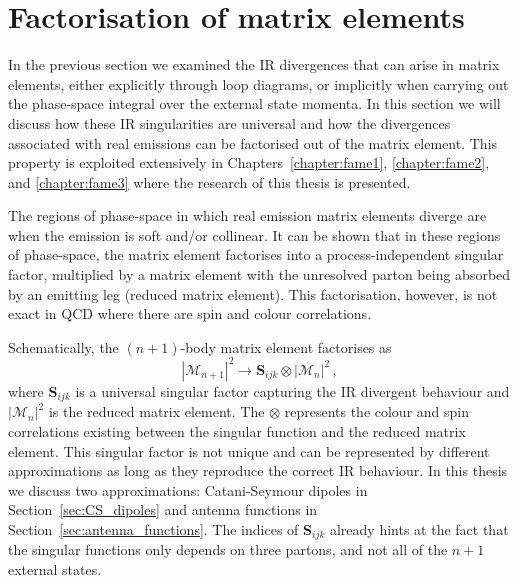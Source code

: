\documentclass[main.tex]{subfiles}
\begin{document}
\section{Factorisation of matrix elements}\label{sec:me_factorisation}
    In the previous section we examined the IR divergences
    that can arise in matrix elements, either explicitly
    through loop diagrams, or implicitly when carrying
    out the phase-space integral over the external state
    momenta. In this section we will discuss how these IR
    singularities are universal and how the divergences
    associated with real emissions can be factorised out
    of the matrix element. This property is exploited
    extensively in Chapters~\ref{chapter:fame1}, \ref{chapter:fame2},
    and \ref{chapter:fame3}
    where the research of this thesis is presented.

    The regions of phase-space in which real emission
    matrix elements diverge are when the emission is
    soft and/or collinear. It can be shown that in these
    regions of phase-space, the matrix element factorises
    into a process-independent singular factor, multiplied
    by a matrix element with the unresolved parton
    being absorbed by an emitting leg (reduced matrix
    element). This factorisation, however, is not exact
    in QCD where there are spin and colour correlations.

    Schematically, the $(n+1)$-body matrix element
    factorises as
    \begin{equation}\label{eqn:me_factorisation}
        |\mathcal{M}_{n+1}|^{2} \rightarrow \bm{S}_{ijk} \otimes |\mathcal{M}_{n}|^{2} \, ,
    \end{equation}
    where $\bm{S}_{ijk}$ is a universal singular factor capturing
    the IR divergent behaviour and $|\mathcal{M}_{n}|^{2}$
    is the reduced matrix element. The $\otimes$
    represents the colour and spin correlations existing
    between the singular function and the reduced matrix element.
    This singular factor
    is not unique and can be represented by different
    approximations as long as they reproduce the
    correct IR behaviour. In this thesis we discuss
    two approximations: Catani-Seymour dipoles \cite{Catani:1996vz}
    in Section~\ref{sec:CS_dipoles} and antenna functions \cite{Gehrmann-DeRidder:2005btv}
    in Section~\ref{sec:antenna_functions}. The indices
    of $\bm{S}_{ijk}$ already hints at the fact that the singular
    functions only depends on three partons, and not all
    of the $n+1$ external states.
\end{document}
